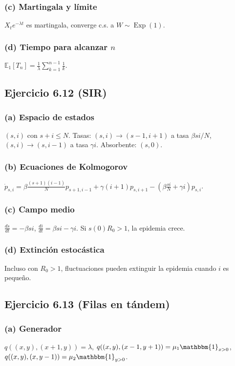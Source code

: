 \documentclass[letterpaper, 12pt]{article}
\newcommand{\E}{\mathbb{E}}
\newcommand{\1}{\mathbbm{1}}
\DeclareMathOperator{\Exp}{Exp}
\begin{document}
    \subsubsection*{(c) Martingala y l\'imite}
    $X_t e^{-\lambda t}$ es martingala, converge c.s. a $W\sim\Exp(1)$.

    \subsubsection*{(d) Tiempo para alcanzar $n$}
    $\E_1[T_n]=\frac1\lambda\sum_{k=1}^{n-1}\frac1k$.

    \subsection{Ejercicio 6.12 (SIR)}

    \subsubsection*{(a) Espacio de estados}
    $(s,i)$ con $s+i\le N$. Tasas: $(s,i)\to(s-1,i+1)$ a tasa $\beta s i/N$, $(s,i)\to(s,i-1)$ a tasa $\gamma i$. Absorbente: $(s,0)$.

    \subsubsection*{(b) Ecuaciones de Kolmogorov}
    $\dot{p}_{s,i}=\beta\frac{(s+1)(i-1)}{N}p_{s+1,i-1}+\gamma(i+1)p_{s,i+1}-\left(\beta\frac{s i}{N}+\gamma i\right)p_{s,i}$.

    \subsubsection*{(c) Campo medio}
    $\frac{ds}{dt}=-\beta s i$, $\frac{di}{dt}=\beta s i-\gamma i$. Si $s(0)R_0>1$, la epidemia crece.

    \subsubsection*{(d) Extinci\'on estoc\'astica}
    Incluso con $R_0>1$, fluctuaciones pueden extinguir la epidemia cuando $i$ es peque\~no.

    \subsection{Ejercicio 6.13 (Filas en t\'andem)}

    \subsubsection*{(a) Generador}
    $q((x,y),(x+1,y))=\lambda$, $q((x,y),(x-1,y+1))=\mu_1\1_{x>0}$, $q((x,y),(x,y-1))=\mu_2\1_{y>0}$.
\end{document}
